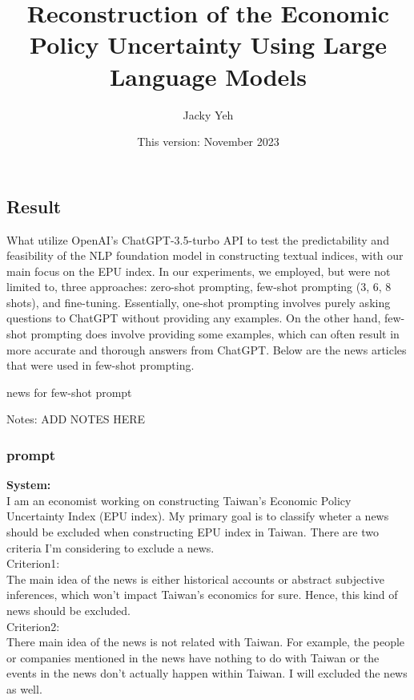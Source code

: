 \documentclass[11pt,english]{report}
\title{\Huge{Reconstruction of the Economic Policy Uncertainty Using Large Language Models}}
\author{\huge{Jacky Yeh}}
\date{{\normalsize{}This version: November 2023\endgraf \vspace{0.5mm}
}}
\begin{document}
\maketitle
\newpage%


\subsection{Result}
What utilize OpenAI's ChatGPT-3.5-turbo API to test the predictability and
feasibility of the NLP foundation model in constructing textual indices, with
our main focus on the EPU index. In our experiments, we employed, but were not
limited to, three approaches: zero-shot prompting, few-shot prompting (3, 6, 8 shots),
and fine-tuning. Essentially, one-shot prompting involves purely asking
questions to ChatGPT without providing any examples. On the other hand, few-shot
prompting does involve providing some examples, which can often result in more
accurate and thorough answers from ChatGPT. Below are the news articles that
were used in few-shot prompting.

\begin{table}[H]
\renewcommand\arraystretch{1.5}
\caption{news for few-shot prompt} 
\label{tab: PayDexMin DID}
\begin{adjustwidth}{-0.0cm}{}
\begin{center}
\setlength{\tabcolsep}{8pt}
{\fontsize{8}{8} \selectfont 
     
}
\end{center}
\end{adjustwidth}
\footnotesize{
\begin{justify}
Notes: ADD NOTES HERE
\end{justify}
}
\end{table}
\newpage
\subsubsection{prompt}
\noindent \textbf{System:} \\
I am an economist working on constructing Taiwan's Economic Policy Uncertainty
Index (EPU index). My primary goal is to classify wheter a news should be
excluded when constructing EPU index in Taiwan. There are two criteria I'm
considering to exclude a news. \\
\noindent Criterion1: \\
The main idea of the news is either historical accounts or abstract subjective
inferences, which won't impact Taiwan's economics for sure. Hence, this kind
of news should be excluded. \\
\noindent Criterion2: \\
There main idea of the news is not related with Taiwan.
For example, the people or companies mentioned in the news have nothing to do
with Taiwan or the events in the news don't actually happen within Taiwan.
I will excluded the news as well. \\
\end{document}
